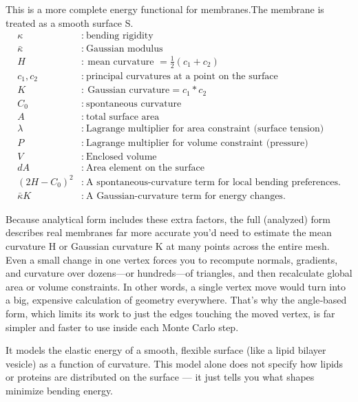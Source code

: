 \documentclass[12pt]{article}
\begin{document}
\begin{flushleft}
\noindent This is a more complete energy functional for membranes.The membrane is treated as a smooth surface S.
\vspace{-2em} 
\begin{align*}
\kappa &:\ \text{bending rigidity} \\
\bar{\kappa} &:\ \text{Gaussian modulus} \\
H &:\ \text{mean curvature $= \frac{1}{2} (c_1 + c_2)$} \\
c_1,c_2 &:\ \text{principal curvatures at a point on the surface}\\
K &:\ \text{Gaussian curvature}=c_1*c_2 \\
C_0 &:\ \text{spontaneous curvature} \\
A &:\ \text{total surface area} \\
\lambda &:\ \text{Lagrange multiplier for area constraint (surface tension)} \\
P &:\ \text{Lagrange multiplier for volume constraint (pressure)}\\
V &:\ \text{Enclosed volume}\\
dA &:\ \text{Area element on the surface}\\
(2H - C_0)^2 &:\ \text{A spontaneous-curvature term for local bending preferences.}\\
\bar{\kappa} K &:\ \text{A Gaussian-curvature term for energy changes.}
\end{align*}




\vspace{-1em}

Because analytical form includes these extra factors, the full (analyzed) form describes real membranes far more accurate you’d need to estimate the mean curvature H or Gaussian curvature K at many points across the entire mesh. Even a small change in one vertex forces you to recompute normals, gradients, and curvature over dozens—or hundreds—of triangles, and then recalculate global area or volume constraints. In other words, a single vertex move would turn into a big, expensive calculation of geometry everywhere. That’s why the angle‐based form, which limits its work to just the edges touching the moved vertex, is far simpler and faster to use inside each Monte Carlo step.












It models the elastic energy of a smooth, flexible surface (like a lipid bilayer vesicle) as a function of curvature. This model alone does not specify how lipids or proteins are distributed on the surface — it just tells you what shapes minimize bending energy.









\end{flushleft}
\end{document}
